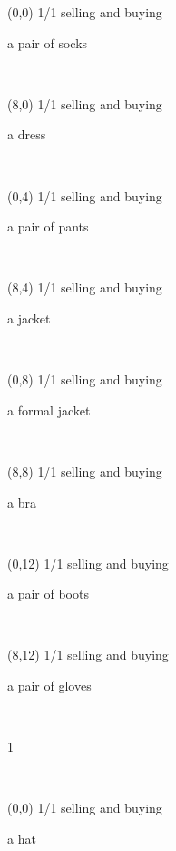 \documentclass[a4paper]{article}
\newcommand{\mycard}[5]{%
	\vspace{0.1cm}
	\small #1 #2
	\par
	\parbox[t][6.7cm][c]{9.5cm}{%
	\hspace{0.1cm} \Large#3\\
	\normalsize#4 #5
	}
}
\begin{document}
\selectfont

\begin{textblock}{8}(0,0)
\mycard{1/1}{selling and buying}{\parbox{9.0cm}{
a pair of socks
}}{}{} 
\end{textblock}

\begin{textblock}{8}(8,0)
\mycard{1/1}{selling and buying}{\parbox{9.0cm}{
a dress
}}{}{} 
\end{textblock}

\begin{textblock}{8}(0,4)
\mycard{1/1}{selling and buying}{\parbox{9.0cm}{
a pair of pants
}}{}{} 
\end{textblock}

\begin{textblock}{8}(8,4)
\mycard{1/1}{selling and buying}{\parbox{9.0cm}{
a jacket
}}{}{} 
\end{textblock}

\begin{textblock}{8}(0,8)
\mycard{1/1}{selling and buying}{\parbox{9.0cm}{
a formal jacket
}}{}{} 
\end{textblock}

\begin{textblock}{8}(8,8)
\mycard{1/1}{selling and buying}{\parbox{9.0cm}{
a bra
}}{}{} 
\end{textblock}

\begin{textblock}{8}(0,12)
\mycard{1/1}{selling and buying}{\parbox{9.0cm}{
a pair of boots
}}{}{} 
\end{textblock}

\begin{textblock}{8}(8,12)
\mycard{1/1}{selling and buying}{\parbox{9.0cm}{
a pair of gloves
}}{}{} 
\end{textblock}

\begin{tiny}1\end{tiny}\\
\newpage

\begin{textblock}{8}(0,0)
\mycard{1/1}{selling and buying}{\parbox{9.0cm}{
a hat
}}{}{} 
\end{textblock}
\end{document}

